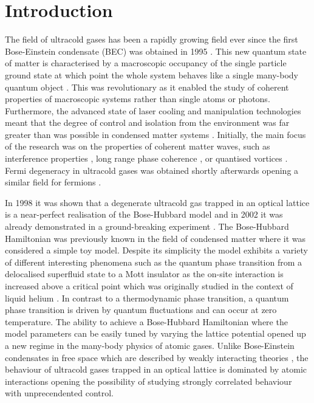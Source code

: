 
\chapter{Introduction}  %

\ifpdf
    \graphicspath{{Chapter1/Figs/Raster/}{Chapter1/Figs/PDF/}{Chapter1/Figs/}}
\else
    \graphicspath{{Chapter1/Figs/Vector/}{Chapter1/Figs/}}
\fi


The field of ultracold gases has been a rapidly growing field ever
since the first Bose-Einstein condensate (BEC) was obtained in 1995
\cite{anderson1995, bradley1995, davis1995}. This new quantum state of
matter is characterised by a macroscopic occupancy of the single
particle ground state at which point the whole system behaves like a
single many-body quantum object \cite{PitaevskiiStringari}. This was
revolutionary as it enabled the study of coherent properties of
macroscopic systems rather than single atoms or photons. Furthermore,
the advanced state of laser cooling and manipulation technologies
meant that the degree of control and isolation from the environment
was far greater than was possible in condensed matter systems
\cite{lewenstein2007, bloch2008}. Initially, the main focus of the
research was on the properties of coherent matter waves, such as
interference properties \cite{andrews1997}, long range phase coherence
\cite{bloch2000}, or quantised vortices \cite{matthews1999,
  madison2000, abo2001}. Fermi degeneracy in ultracold gases was
obtained shortly afterwards opening a similar field for fermions
\cite{demarco1999, schreck2001, truscott2001}.

In 1998 it was shown that a degenerate ultracold gas trapped in an
optical lattice is a near-perfect realisation of the Bose-Hubbard
model \cite{jaksch1998} and in 2002 it was already demonstrated in a
ground-breaking experiment \cite{greiner2002}. The Bose-Hubbard
Hamiltonian was previously known in the field of condensed matter
where it was considered a simple toy model. Despite its simplicity the
model exhibits a variety of different interesting phenomena such as
the quantum phase transition from a delocalised superfluid state to a
Mott insulator as the on-site interaction is increased above a
critical point which was originally studied in the context of liquid
helium \cite{fisher1989}. In contrast to a thermodynamic phase
transition, a quantum phase transition is driven by quantum
fluctuations and can occur at zero temperature. The ability to achieve
a Bose-Hubbard Hamiltonian where the model parameters can be easily
tuned by varying the lattice potential opened up a new regime in the
many-body physics of atomic gases. Unlike Bose-Einstein condensates in
free space which are described by weakly interacting theories
\cite{dalfovo1999}, the behaviour of ultracold gases trapped in an
optical lattice is dominated by atomic interactions opening the
possibility of studying strongly correlated behaviour with
unprecendented control.

